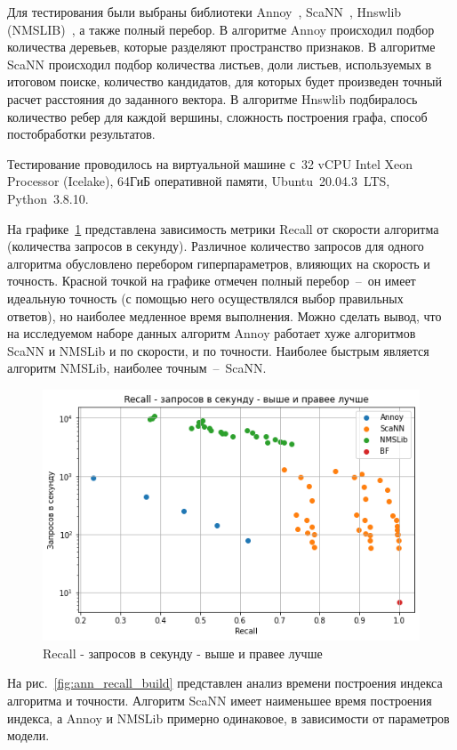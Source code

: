 \documentclass[a4paper,14pt]{article}
\begin{document}
    Для тестирования были выбраны библиотеки Annoy~\cite{annoy}, ScaNN~\cite{avq_2020}, Hnswlib (NMSLIB)~\cite{malkov2018efficient}, а также полный перебор.
    В алгоритме Annoy происходил подбор количества деревьев, которые разделяют пространство признаков.
    В алгоритме ScaNN происходил подбор количества листьев, доли листьев, используемых в итоговом поиске, количество кандидатов, для которых будет произведен точный расчет расстояния до заданного вектора.
    В алгоритме Hnswlib подбиралось количество ребер для каждой вершины, сложность построения графа, способ постобработки результатов.

    Тестирование проводилось на виртуальной машине с~32 vCPU Intel Xeon Processor (Icelake), 64ГиБ оперативной памяти, Ubuntu~20.04.3~LTS, Python~3.8.10.

    На графике~\ref{fig:ann_recall_qps} представлена зависимость метрики Recall от скорости алгоритма (количества запросов в секунду).
    Различное количество запросов для одного алгоритма обусловлено перебором гиперпараметров, влияющих на скорость и точность.
    Красной точкой на графике отмечен полный перебор~--~он имеет идеальную точность (с помощью него осуществлялся выбор правильных ответов), но наиболее медленное время выполнения.
    Можно сделать вывод, что на исследуемом наборе данных алгоритм Annoy работает хуже алгоритмов ScaNN и NMSLib и по скорости, и по точности.
    Наиболее быстрым является алгоритм NMSLib, наиболее точным~--~ScaNN.

    \begin{figure}[H]
        \centering
        \includegraphics[width=0.7\linewidth]{images/ann_recall_qps}
        \caption{Recall - запросов в секунду - выше и правее лучше}
        \label{fig:ann_recall_qps}
    \end{figure}

    На рис.~\ref{fig:ann_recall_build} представлен анализ времени построения индекса алгоритма и точности.
    Алгоритм ScaNN имеет наименьшее время построения индекса, а Annoy и NMSLib примерно одинаковое, в зависимости от параметров модели.
\end{document}
